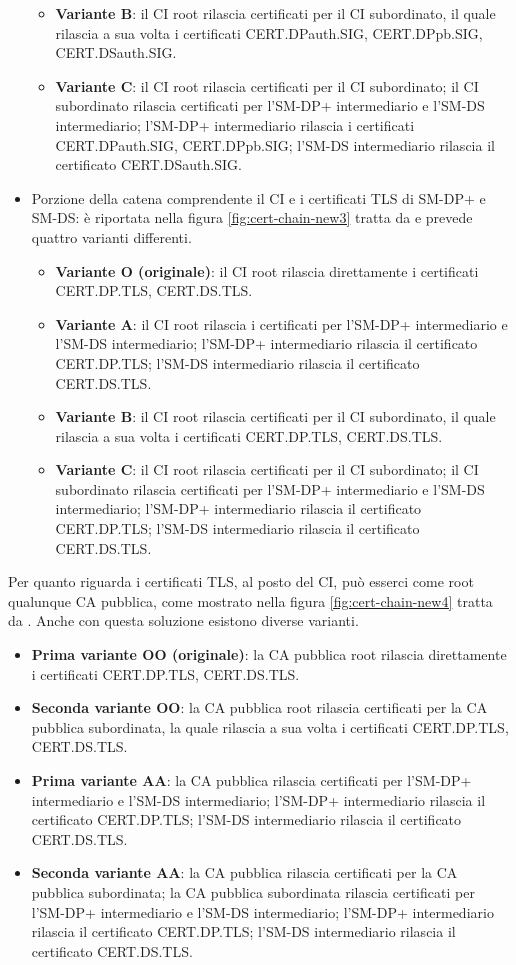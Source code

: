 \documentclass[10pt, oneside]{book}
\begin{document}
\begin{itemize}
\begin{itemize}
\item \textbf{Variante B}: il CI root rilascia certificati per il CI subordinato, il quale rilascia a sua volta i certificati CERT.DPauth.SIG, CERT.DPpb.SIG, CERT.DSauth.SIG.
\item \textbf{Variante C}: il CI root rilascia certificati per il CI subordinato; il CI subordinato rilascia certificati per l'SM-DP+ intermediario e l'SM-DS intermediario; l'SM-DP+ intermediario rilascia i certificati CERT.DPauth.SIG, CERT.DPpb.SIG; l'SM-DS intermediario rilascia il certificato CERT.DSauth.SIG.
\end{itemize}
\item Porzione della catena comprendente il CI e i certificati TLS di SM-DP+ e SM-DS: è riportata nella figura \ref{fig:cert-chain-new3} tratta da \cite{GSMA-docs-new} e prevede quattro varianti differenti.
\begin{itemize}
\item \textbf{Variante O (originale)}: il CI root rilascia direttamente i certificati CERT.DP.TLS, CERT.DS.TLS.
\item \textbf{Variante A}: il CI root rilascia i certificati per l'SM-DP+ intermediario e l'SM-DS intermediario; l'SM-DP+ intermediario rilascia il certificato CERT.DP.TLS; l'SM-DS intermediario rilascia il certificato CERT.DS.TLS.
\item \textbf{Variante B}: il CI root rilascia certificati per il CI subordinato, il quale rilascia a sua volta i certificati CERT.DP.TLS, CERT.DS.TLS.
\item \textbf{Variante C}: il CI root rilascia certificati per il CI subordinato; il CI subordinato rilascia certificati per l'SM-DP+ intermediario e l'SM-DS intermediario; l'SM-DP+ intermediario rilascia il certificato CERT.DP.TLS; l'SM-DS intermediario rilascia il certificato CERT.DS.TLS.
\end{itemize}
\end{itemize}
Per quanto riguarda i certificati TLS, al posto del CI, può esserci come root qualunque CA pubblica, come mostrato nella figura \ref{fig:cert-chain-new4} tratta da \cite{GSMA-docs-new}. Anche con questa soluzione esistono diverse varianti.
\begin{itemize}
\item \textbf{Prima variante OO (originale)}: la CA pubblica root rilascia direttamente i certificati CERT.DP.TLS, CERT.DS.TLS.
\item \textbf{Seconda variante OO}: la CA pubblica root rilascia certificati per la CA pubblica subordinata, la quale rilascia a sua volta i certificati CERT.DP.TLS, CERT.DS.TLS.
\item \textbf{Prima variante AA}: la CA pubblica rilascia certificati per l'SM-DP+ intermediario e l'SM-DS intermediario; l'SM-DP+ intermediario rilascia il certificato CERT.DP.TLS; l'SM-DS intermediario rilascia il certificato CERT.DS.TLS.
\item \textbf{Seconda variante AA}: la CA pubblica rilascia certificati per la CA pubblica subordinata; la CA pubblica subordinata rilascia certificati per l'SM-DP+ intermediario e l'SM-DS intermediario; l'SM-DP+ intermediario rilascia il certificato CERT.DP.TLS; l'SM-DS intermediario rilascia il certificato CERT.DS.TLS.
\end{itemize}
\end{document}

